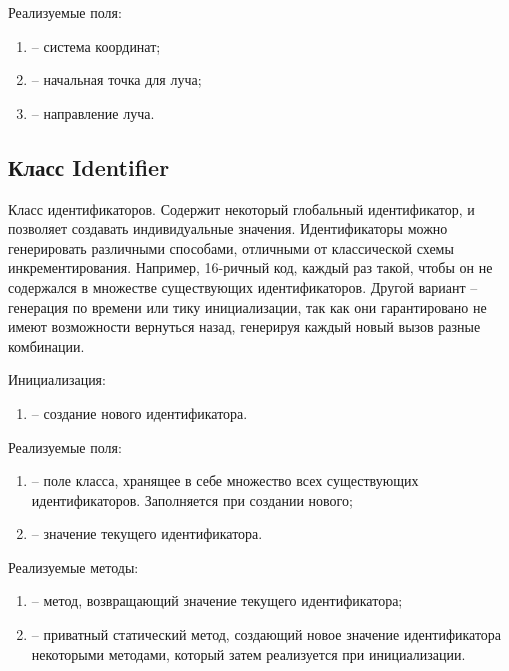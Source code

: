 	\noindent Реализуемые поля:
	\begin{enumerate}
		\item {} -- система координат;
		\item {} -- начальная точка для луча;
		\item {} -- направление луча.
	\end{enumerate}

\subsection{Класс Identifier}
	\noindent Класс идентификаторов. Содержит некоторый глобальный идентификатор, и позволяет создавать индивидуальные значения. Идентификаторы можно генерировать различными способами, отличными от классической схемы инкрементирования. Например, 16-ричный код, каждый раз такой, чтобы он не содержался в множестве существующих идентификаторов. Другой вариант -- генерация по времени или тику инициализации, так как они гарантировано не имеют возможности вернуться назад, генерируя каждый новый вызов разные комбинации.

	\noindent Инициализация:
	\begin{enumerate}
		\item {} -- создание нового идентификатора.
	\end{enumerate}

	\noindent Реализуемые поля:
	\begin{enumerate}
		\item {} -- поле класса, хранящее в себе множество всех существующих идентификаторов. Заполняется при создании нового;
		\item {} -- значение текущего идентификатора.
	\end{enumerate}

	\noindent Реализуемые методы:
	\begin{enumerate}
		\item {} -- метод, возвращающий значение текущего идентификатора;
		\item {} -- приватный статический метод, создающий новое значение идентификатора некоторыми методами, который затем реализуется при инициализации.
	\end{enumerate}

